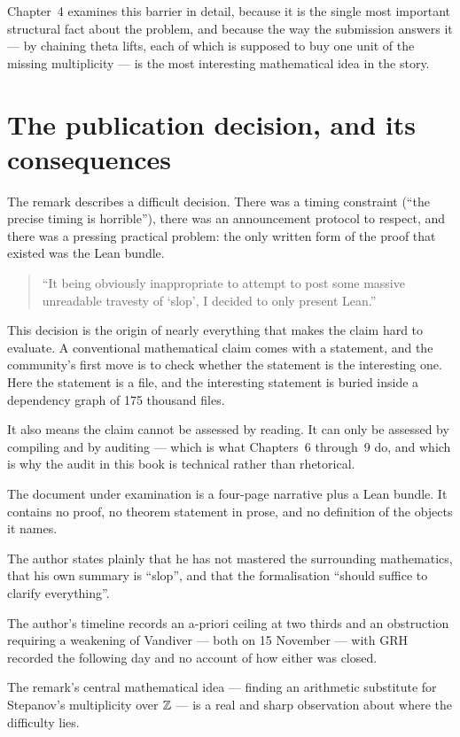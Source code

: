Chapter~4 examines this barrier in detail, because it is the single most
important structural fact about the problem, and because the way the submission
answers it --- by chaining theta lifts, each of which is supposed to buy one
unit of the missing multiplicity --- is the most interesting mathematical idea
in the story.

\section{The publication decision, and its consequences}The remark describes a difficult decision. There was a timing constraint
(``the precise timing is horrible''), there was an announcement protocol to
respect, and there was a pressing practical problem: the only written form of
the proof that existed was the Lean bundle.

\begin{quote}
\small
``It being obviously inappropriate to attempt to post some massive unreadable
travesty of `slop', I decided to only present Lean.''
\end{quote}

This decision is the origin of nearly everything that makes the claim hard to
evaluate. A conventional mathematical claim comes with a statement, and the
community's first move is to check whether the statement is the interesting one.
Here the statement is a file, and the interesting statement is buried inside a
dependency graph of 175 thousand files.

It also means the claim cannot be assessed by reading. It can only be assessed
by compiling and by auditing --- which is what Chapters~6 through~9 do, and
which is why the audit in this book is technical rather than rhetorical.

\begin{keytakeaways}

\item The document under examination is a four-page narrative plus a Lean
bundle. It contains no proof, no theorem statement in prose, and no definition
of the objects it names.
\item The author states plainly that he has not mastered the surrounding
mathematics, that his own summary is ``slop'', and that the formalisation
``should suffice to clarify everything''.
\item The author's timeline records an a-priori ceiling at two thirds and an
obstruction requiring a weakening of Vandiver --- both on 15 November --- with
GRH recorded the following day and no account of how either was closed.
\item The remark's central mathematical idea --- finding an arithmetic
substitute for Stepanov's multiplicity over $\mathbb{Z}$ --- is a real and sharp
observation about where the difficulty lies.
\end{keytakeaways}

